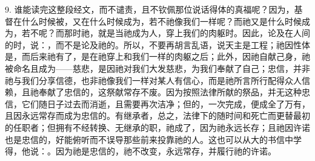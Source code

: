 9. 谁能读完这整段经文，而不谴责，且不钦佩那位说话得体的真福呢？因为，基督在什么时候被，又在什么时候成为，若不祂像我们一样呢？而祂又是什么时候成为，若不呢？而那时祂，就是当祂成为人，穿上我们的肉躯时。因此，论及在人间的时，说：，而不是论及祂的。所以，不要再胡言乱语，说天主是工程；祂因性体是，而后来祂有了，是在祂穿上和我们一样的肉躯之后；此外，因祂自献己身，祂被命名且成为——慈悲，是因祂对我们大发慈悲，为我们奉献了自己；忠信，并非祂与我们分享信德，也非祂像我们一样对某人有信心，而是祂所言所行配得众人信赖，且祂奉献了忠信的，这祭献常存不废。因为按照法律所献的祭品，并无这种忠信，它们随日子过去而消逝，且需要再次洁净；但的，一次完成，便成全了万有，且因永远常存而成为忠信的。有继承者，总之，法律下的随时间和死亡而更替最初的任职者；但拥有不经转换、无继承的职，祂成了，因为祂永远长存；且祂因许诺也是忠信的，好能俯听而不误导那些前来投靠祂的人。这也可以从大的书信中学得，他说：。因为祂是忠信的，祂不改变，永远常存，并履行祂的许诺。\par

